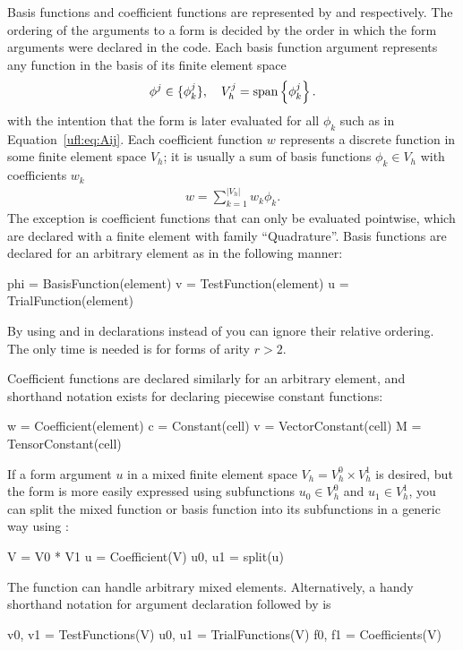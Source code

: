 Basis functions and coefficient functions are represented by
 and  respectively. The ordering
of the arguments to a form is decided by the order in which the form
arguments were declared in the \ufl{} code.  Each basis function
argument represents any function in the basis of its finite element
space
\begin{align}
  \phi^j \in \{\phi_k^j\}, \quad V_h^j = \operatorname{span}\left\{ \phi_k^j \right\}.
\end{align}
with the intention that the form is later evaluated for all $\phi_k$
such as in Equation~\eqref{ufl:eq:Aij}.  Each coefficient function $w$
represents a discrete function in some finite element space $V_h$; it
is usually a sum of basis functions $\phi_k \in V_h$ with coefficients
$w_k$
\begin{align}
w = \sum_{k=1}^{|V_h|} w_k \phi_k.
\end{align}
The exception is coefficient functions that can only be evaluated
pointwise, which are declared with a finite element with family
``Quadrature''.  Basis functions are declared for an arbitrary element
as in the following manner:
\begin{python}
phi = BasisFunction(element)
v = TestFunction(element)
u = TrialFunction(element)
\end{python}
By using  and  in
declarations instead of  you can ignore their
relative ordering.  The only time  is needed is
for forms of arity $r > 2$.

Coefficient functions are declared similarly for an arbitrary element,
and shorthand notation exists for declaring piecewise constant
functions:
\begin{python}
w = Coefficient(element)
c = Constant(cell)
v = VectorConstant(cell)
M = TensorConstant(cell)
\end{python}
If a form argument $u$ in a mixed finite element space $V_h = V_h^0
\times V_h^1$ is desired, but the form is more easily expressed using
subfunctions $u_0 \in V_h^0$ and $u_1 \in V_h^1$, you can split the
mixed function or basis function into its subfunctions in a generic
way using :
\begin{python}
V = V0 * V1
u = Coefficient(V)
u0, u1 = split(u)
\end{python}
The  function can handle arbitrary mixed elements.
Alternatively, a handy shorthand notation for argument declaration
followed by  is
\begin{python}
v0, v1 = TestFunctions(V)
u0, u1 = TrialFunctions(V)
f0, f1 = Coefficients(V)
\end{python}


